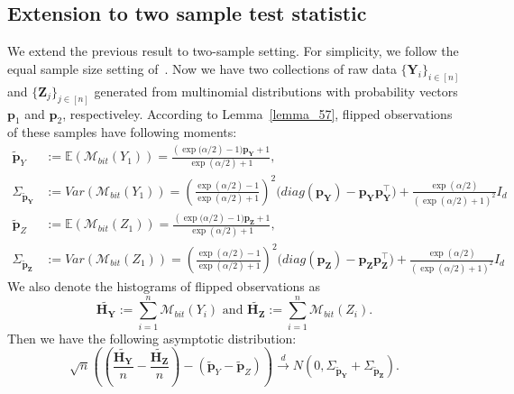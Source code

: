 \documentclass[11pt]{article} %
\begin{document}
\subsection{Extension to two sample test statistic}
We extend the previous result  to two-sample setting.
For simplicity, we follow the equal sample size setting of~\citet{Gaboardi2018LDPChisq}.
Now we have two collections of  raw data $\{\boldsymbol{Y}_i\}_{i \in [n]}$ and $\{\boldsymbol{Z}_j\}_{j \in [n]}$ generated from multinomial distributions with probability vectors $\boldsymbol{p}_1$ and $\boldsymbol{p}_2$, respectiveley.
According to Lemma~\ref{lemma_57}, flipped observations of these samples have following moments:
\begin{align*}
	\tilde{\boldsymbol{p}}_Y
	&:=
	\mathbb{E}(\mathcal{M}_{bit}(Y_1))
	=
	\frac{(\exp
		\bigl(
		\alpha/2)-1
		\bigr) \boldsymbol{p}_{\boldsymbol{Y}}+1}{\exp(\alpha/2)+1},
	\\ 
	\Sigma_{\tilde{\boldsymbol{p}}_{\boldsymbol{Y}}} &:= Var(\mathcal{M}_{bit}(Y_1))=	\left(
	\frac{\exp(\alpha/2)-1}{\exp(\alpha/2)+1}
	\right)^2
	\bigl(
	diag(\boldsymbol{p}_{\boldsymbol{Y}}) - \boldsymbol{p}_{\boldsymbol{Y}} \boldsymbol{p}_{\boldsymbol{Y}}^\top
	\bigr)
	+
	\frac{\exp(\alpha/2)}{(\exp(\alpha/2)+1)^2}
	I_d
\\
	\tilde{\boldsymbol{p}}_Z
&:=
\mathbb{E}(\mathcal{M}_{bit}(Z_1))
=
\frac{(\exp
	\bigl(
	\alpha/2)-1
	\bigr) \boldsymbol{p}_{\boldsymbol{Z}}+1}{\exp(\alpha/2)+1},
\\ 
\Sigma_{\tilde{\boldsymbol{p}}_{\boldsymbol{Z}}} &:= Var(\mathcal{M}_{bit}(Z_1))=	\left(
\frac{\exp(\alpha/2)-1}{\exp(\alpha/2)+1}
\right)^2
\bigl(
diag(\boldsymbol{p}_{\boldsymbol{Z}}) - \boldsymbol{p}_{\boldsymbol{Z}} \boldsymbol{p}_{\boldsymbol{Z}}^\top
\bigr)
+
\frac{\exp(\alpha/2)}{(\exp(\alpha/2)+1)^2}
I_d
\end{align*}
We also denote the histograms of flipped observations as 
\begin{equation}
	\tilde{\boldsymbol{H}_{\boldsymbol{Y}}}:= \sum_{i=1}^{n} \mathcal{M}_{bit}(Y_i) \text{ and }
	\tilde{\boldsymbol{H}_{\boldsymbol{Z}}}:= \sum_{i=1}^{n} \mathcal{M}_{bit}(Z_i).
\end{equation} 
Then we have the following asymptotic distribution:
\begin{equation}\label{chisq_twosample_first_asymptotic}
\sqrt{n}
\left(
	\left(
		\frac{\tilde{\boldsymbol{H}_{\boldsymbol{Y}}}}{n} -
		\frac{\tilde{\boldsymbol{H}_{\boldsymbol{Z}}}}{n}
	\right)
	-
	(\tilde{\boldsymbol{p}}_Y - \tilde{\boldsymbol{p}}_Z)
\right)
\stackrel{d}{\to}
N(0, \Sigma_{\tilde{\boldsymbol{p}}_{\boldsymbol{Y}}} + \Sigma_{\tilde{\boldsymbol{p}}_{\boldsymbol{Z}}}).
\end{equation}
\end{document}
